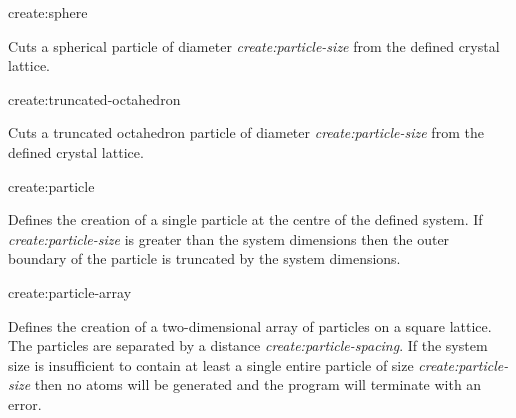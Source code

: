 {\zicf create:sphere} Cuts a spherical particle of diameter \textit{create:particle-size} from the defined crystal lattice.\\ \par

{\zicf create:truncated-octahedron} Cuts a truncated octahedron particle of diameter \textit{create:particle-size} from the defined crystal lattice.\\ \par


{\zicf create:particle} Defines the creation of a single particle at the centre of the defined system. If \textit{create:particle-size} is greater than the system dimensions then the outer boundary of the particle is truncated by the system dimensions. \\ \par

{\zicf create:particle-array} Defines the creation of a two-dimensional array of particles on a square lattice. The particles are separated by a distance \textit{create:particle-spacing}. If the system size is insufficient to contain at least a single entire particle of size \textit{create:particle-size} then no atoms will be generated and the program will terminate with an error.\\ \par


